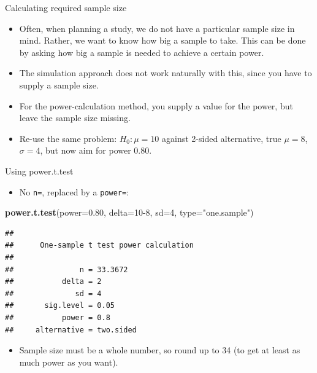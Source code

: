 \documentclass[ignorenonframetext,]{beamer}
\newenvironment{Shaded}{\begin{snugshade}}{\end{snugshade}}
\newcommand{\DataTypeTok}[1]{\textcolor[rgb]{0.13,0.29,0.53}{#1}}
\newcommand{\DecValTok}[1]{\textcolor[rgb]{0.00,0.00,0.81}{#1}}
\newcommand{\FloatTok}[1]{\textcolor[rgb]{0.00,0.00,0.81}{#1}}
\newcommand{\KeywordTok}[1]{\textcolor[rgb]{0.13,0.29,0.53}{\textbf{#1}}}
\newcommand{\NormalTok}[1]{#1}
\newcommand{\StringTok}[1]{\textcolor[rgb]{0.31,0.60,0.02}{#1}}
\providecommand{\tightlist}{%
  \setlength{\itemsep}{0pt}\setlength{\parskip}{0pt}}
\begin{document}
\begin{frame}{Calculating required sample size}
\protect\hypertarget{calculating-required-sample-size}{}

\begin{itemize}
\tightlist
\item
  Often, when planning a study, we do not have a particular sample size
  in mind. Rather, we want to know how big a sample to take. This can be
  done by asking how big a sample is needed to achieve a certain power.
\item
  The simulation approach does not work naturally with this, since you
  have to supply a sample size.
\item
  For the power-calculation method, you supply a value for the power,
  but leave the sample size missing.
\item
  Re-use the same problem: \(H_0 : \mu = 10\) against 2-sided
  alternative, true \(\mu = 8\), \(\sigma = 4\), but now aim for power
  0.80.
\end{itemize}

\end{frame}

\begin{frame}[fragile]{Using power.t.test}
\protect\hypertarget{using-power.t.test}{}

\begin{itemize}
\tightlist
\item
  No \texttt{n=}, replaced by a \texttt{power=}:
\end{itemize}

\begin{Shaded}
\begin{Highlighting}[]
\KeywordTok{power.t.test}\NormalTok{(}\DataTypeTok{power=}\FloatTok{0.80}\NormalTok{, }\DataTypeTok{delta=}\DecValTok{10-8}\NormalTok{, }\DataTypeTok{sd=}\DecValTok{4}\NormalTok{, }\DataTypeTok{type=}\StringTok{"one.sample"}\NormalTok{)}
\end{Highlighting}
\end{Shaded}

\begin{verbatim}
## 
##      One-sample t test power calculation 
## 
##               n = 33.3672
##           delta = 2
##              sd = 4
##       sig.level = 0.05
##           power = 0.8
##     alternative = two.sided
\end{verbatim}

\begin{itemize}
\tightlist
\item
  Sample size must be a whole number, so round up to 34 (to get at least
  as much power as you want).
\end{itemize}

\end{frame}
\end{document}

